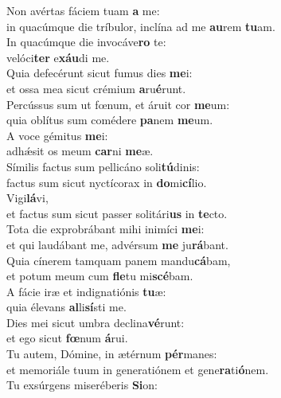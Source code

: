 \evenverse Non avértas fáciem tuam \textbf{a} me:~\*\\
\evenverse in quacúmque die tríbulor, inclína ad me \textbf{au}rem \textbf{tu}am.\\
\oddverse In quacúmque die invocáve\textbf{ro} te:~\*\\
\oddverse velóci\textbf{ter} e\textbf{xáu}di me.\\
\evenverse Quia defecérunt sicut fumus dies \textbf{me}i:~\*\\
\evenverse et ossa mea sicut crémium \textbf{a}ru\textbf{é}runt.\\
\oddverse Percússus sum ut fœnum, et áruit cor \textbf{me}um:~\*\\
\oddverse quia oblítus sum comédere \textbf{pa}nem \textbf{me}um.\\
\evenverse A voce gémitus \textbf{me}i:~\*\\
\evenverse adhǽsit os meum \textbf{car}ni \textbf{me}æ.\\
\oddverse Símilis factus sum pellicáno soli\textbf{tú}dinis:~\*\\
\oddverse factus sum sicut nyctícorax in \textbf{do}mi\textbf{cí}lio.\\
\evenverse Vigi\textbf{lá}vi,~\*\\
\evenverse et factus sum sicut passer solitári\textbf{us} in \textbf{te}cto.\\
\oddverse Tota die exprobrábant mihi inimíci \textbf{me}i:~\*\\
\oddverse et qui laudábant me, advérsum \textbf{me} ju\textbf{rá}bant.\\
\evenverse Quia cínerem tamquam panem mandu\textbf{cá}bam,~\*\\
\evenverse et potum meum cum \textbf{fle}tu mi\textbf{scé}bam.\\
\oddverse A fácie iræ et indignatiónis \textbf{tu}æ:~\*\\
\oddverse quia élevans \textbf{al}li\textbf{sí}sti me.\\
\evenverse Dies mei sicut umbra declina\textbf{vé}runt:~\*\\
\evenverse et ego sicut \textbf{fœ}num \textbf{á}rui.\\
\oddverse Tu autem, Dómine, in ætérnum \textbf{pér}manes:~\*\\
\oddverse et memoriále tuum in generatiónem et gene\textbf{ra}ti\textbf{ó}nem.\\
\evenverse Tu exsúrgens miseréberis \textbf{Si}on:~\*\\
